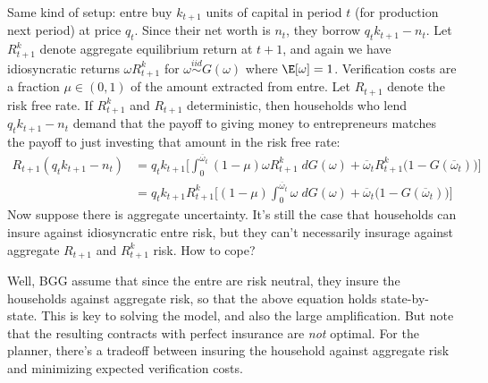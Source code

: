 \documentclass[12pt]{article}
\theoremstyle{plain}
\theoremstyle{definition}
\theoremstyle{remark}
\newcommand{\iid}{\overset{iid}{\sim}}
\begin{document}
Same kind of setup: entre buy $k_{t+1}$ units of capital in period $t$
(for production next period) at price $q_t$.
Since their net worth is $n_t$, they borrow $q_tk_{t+1}-n_t$.
Let $R_{t+1}^k$ denote aggregate equilibrium return at $t+1$, and again
we have idiosyncratic returns $\omega R_{t+1}^k$ for
$\omega\iid G(\omega)$ where $\E[\omega]=1$.
Verification costs are a fraction $\mu\in(0,1)$ of the amount extracted
from entre.
Let $R_{t+1}$ denote the risk free rate.
If $R_{t+1}^k$ and $R_{t+1}$ deterministic, then households who lend
$q_tk_{t+1}-n_t$ demand that the payoff to giving money to entrepreneurs
matches the payoff to just investing that amount in the risk free rate:
\begin{align*}
  R_{t+1}(q_tk_{t+1}-n_t)
  &=
  q_tk_{t+1}
  \bigg[
  \int_0^{\overline{\omega}_t}
  (1-\mu)\omega R_{t+1}^k\;dG(\omega)
  +
  \overline{\omega}_tR_{t+1}^k\big(1-G(\overline{\omega}_t))
  \bigg]
  \\
  &=
  q_tk_{t+1}
  R_{t+1}^k
  \bigg[
  (1-\mu)\int_0^{\overline{\omega}_t}
  \omega\;dG(\omega)
  +
  \overline{\omega}_t\big(1-G(\overline{\omega}_t))
  \bigg]
\end{align*}
Now suppose there is aggregate uncertainty.
It's still the case that households can insure against idiosyncratic
entre risk, but they can't necessarily insurage against aggregate
$R_{t+1}$ and $R_{t+1}^k$ risk.
How to cope?

Well, BGG assume that since the entre are risk neutral, they insure the
households against aggregate risk, so that the above equation holds
state-by-state.
This is key to solving the model, and also the large amplification.
But note that the resulting contracts with perfect insurance are
\emph{not} optimal.
For the planner, there's a tradeoff between insuring the household
against aggregate risk and minimizing expected verification costs.
\end{document}
